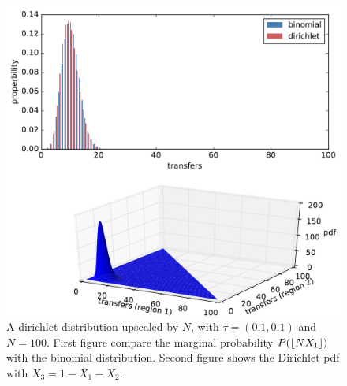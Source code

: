 \begin{figure}[H]
	\centering
	\includegraphics[width= 1.0 \linewidth]{plots/dirichlet-validation}
	\caption{A dirichlet distribution  upscaled by $N$, with $\tau = (0.1, 0.1)$ and $N = 100$. First figure compare the marginal probability $P(\floor*{N X_1})$ with the binomial distribution. Second figure shows the Dirichlet pdf with $X_3 = 1- X_1 - X_2$.}
\end{figure}


